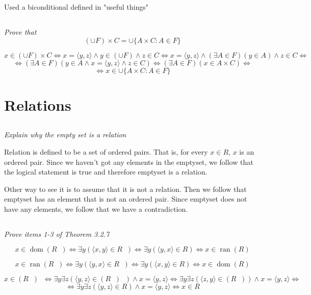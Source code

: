 \documentclass[11pt,oneside,titlepage]{book}
\DeclareMathOperator \inv {^{-1}}
\DeclareMathOperator \lra {\Leftrightarrow}
\DeclareMathOperator \dom {dom}
\DeclareMathOperator \ran {ran}
\newcommand{\eangle}[1]{\langle #1 \rangle}
\begin{document}
Used a biconditional defined in "useful things"


\subsection{}

\textit{Prove that $$(\cup F) \times C = \cup\{A \times C: A \in F\}$$}

$$x \in (\cup F) \times C \lra x = \eangle{y, z} \land y \in (\cup F) \land z \in C \lra
x = \eangle{y, z} \land (\exists A \in F)(y \in A) \land z \in C \lra
$$
$$ \lra   (\exists A \in F)(y \in A \land x = \eangle{y, z} \land z \in C) \lra
(\exists A \in F)(x \in A \times C) \lra$$
$$\lra x \in  \cup\{A \times C: A \in F\}$$

\section{Relations}

\subsection{}

\textit{Explain why the empty set is a relation}

Relation is defined to be a set of ordered pairs. That is, for every $x \in R$, $x$ is an ordered pair.
Since we haven't got any elements in the emptyset, we follow that the logical statement is true and  therefore
emptyset is a relation.

Other way to see it is to assume that it is not a relation. Then we follow that emptyset has an element that
is not an ordered pair. Since emptyset does not have any elements, we follow that we have
a contradiction.

\subsection{}

\textit{Prove items 1-3 of Theorem 3.2.7}

$$x \in \dom(R \inv) \lra \exists y (\eangle{x, y} \in R \inv)
\lra \exists y (\eangle{y, x} \in R) \lra x \in \ran(R)$$

$$x \in \ran(R \inv) \lra \exists y (\eangle{y, x} \in R \inv)
\lra \exists y (\eangle{x, y} \in R) \lra x \in \dom(R)$$

$$x \in (R \inv) \inv \lra \exists y \exists z (\eangle{y, z} \in (R \inv) \inv ) \land x = \eangle{y, z}
\lra \exists y \exists z (\eangle{z, y} \in (R \inv) ) \land x = \eangle{y, z} \lra $$
$$ \lra  \exists y \exists z (\eangle{y, z} \in R ) \land x = \eangle{y, z} \lra x \in R$$
\end{document}
